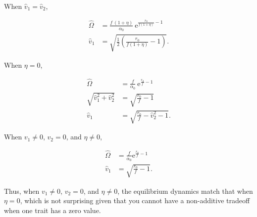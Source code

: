 When $\hat{v}_1 = \hat{v}_2$,

\begin{equation}  \label{eq:two-traits-finals1}
\begin{split}
    \hat{\Omega} &= \frac{ f ~ ( 1 + \eta ) }{ \alpha_0 } ~
        \textrm{e}^{\frac{  r_0 }{ f ( 1 + \eta ) } - 1 }
        \\
    \hat{v}_1 &= \sqrt{
        \frac{1}{2} \left( \frac{ r_0 }{ f (1 + \eta) } - 1 \right)
    }
    \textrm{.}
\end{split}
\end{equation}


\noindent When $\eta = 0$,

\begin{equation}  \label{eq:two-traits-finals2}
\begin{split}
    \hat{\Omega} &= \frac{ f }{ \alpha_0 } ~ \textrm{e}^{\frac{ r_0 }{ f } - 1 } \\
    \sqrt{\hat{v}_1^2 + \hat{v}_2^2} &= \sqrt{ \frac{ r_0 }{ f } - 1 } \\
    \hat{v}_1 &= \sqrt{ \frac{ r_0  }{ f } - \hat{v}_2^2 - 1 }
    \textrm{.}
\end{split}
\end{equation}


\noindent When $v_1 \ne 0$, $v_2 = 0$, and $\eta \ne 0$,

\begin{equation}  \label{eq:two-traits-finals3}
\begin{split}
    \hat{\Omega} &= \frac{f}{\alpha_0} \textrm{e}^{\frac{r_0}{f} - 1} \\
    \hat{v}_1 &= \sqrt{ \frac{ r_0 }{ f } - 1 }
    \textrm{.}
\end{split}
\end{equation}

\noindent Thus, when $v_1 \ne 0$, $v_2 = 0$, and $\eta \ne 0$, the equilibrium
dynamics match that when $\eta = 0$, which is not surprising given that
you cannot have a non-additive tradeoff when one trait has a zero value.


